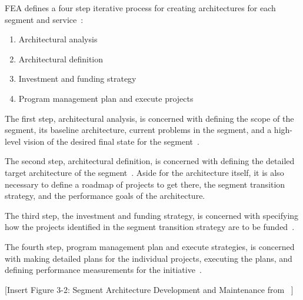  
FEA defines a four step iterative process for creating architectures for each segment and service~\cite{FederalEnterpriseArchitectureProgramManagementOffice2007}:
\begin{enumerate}
    \item Architectural analysis
    \item Architectural definition
    \item Investment and funding strategy
    \item Program management plan and execute projects
\end{enumerate}


The first step, architectural analysis, is concerned with defining the scope of the segment, its baseline architecture, current problems in the segment, and a high-level vision of the desired final state for the segment~\cite{FederalEnterpriseArchitectureProgramManagementOffice2007}.

The second step, architectural definition, is concerned with defining the detailed target architecture of the segment~\cite{FederalEnterpriseArchitectureProgramManagementOffice2007}. Aside for the architecture itself, it is also necessary to define a roadmap of projects to get there, the segment transition strategy, and the performance goals of the architecture. 
  
The third step, the investment and funding strategy, is concerned with specifying how the projects identified in the segment transition strategy are to be funded~\cite{FederalEnterpriseArchitectureProgramManagementOffice2007}. 

The fourth step, program management plan and execute strategies, is concerned with making detailed plans for the individual projects, executing the plans, and defining performance measurements for the initiative~\cite{FederalEnterpriseArchitectureProgramManagementOffice2007}.

[Insert Figure 3-2: Segment Architecture Development and Maintenance from ~\cite{FederalEnterpriseArchitectureProgramManagementOffice2007}]

